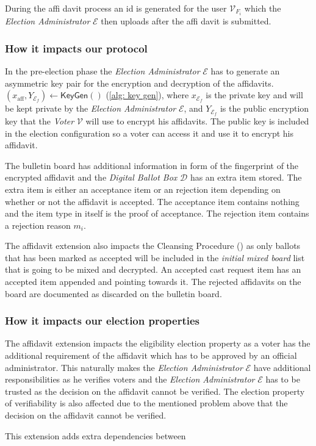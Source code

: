 During the affi davit process an id is generated for the user $\mathcal{V}_{{F}_i}$ which the \textit{Election Administrator} $\mathcal{E}$ then uploads after the affi davit is submitted.


\subsubsection{How it impacts our protocol}
In the pre-election phase the \textit{Election Administrator} $\mathcal{E}$ has to generate an asymmetric key pair for the encryption and decryption of the affidavits. \( (x_\mathrm{aff}, Y_{\mathcal{E}_f}) \leftarrow \mathsf{KeyGen}() \) (\cref{alg: key gen}), where $x_{\mathcal{E}_f}$ is the private key and will be kept private by the \textit{Election Administrator} $\mathcal{E}$, and $Y_{\mathcal{E}_f}$ is the public encryption key that the \textit{Voter} $\mathcal{V}$ will use to encrypt his affidavits. The public key is included in the election configuration so a voter can access it and use it to encrypt his affidavit.

The bulletin board has additional information in form of the fingerprint of the encrypted affidavit and the \textit{Digital Ballot Box} $\mathcal{D}$ has an extra item stored. The extra item is either an acceptance item or an rejection item depending on whether or not the affidavit is accepted. The acceptance item contains nothing and the item type in itself is the proof of acceptance. The rejection item contains a rejection reason $m_i$. 

The affidavit extension also impacts the Cleansing Procedure () as only ballots that has been marked as accepted will be included in the \textit{initial mixed board} list that is going to be mixed and decrypted. An accepted cast request item has an accepted item appended and pointing towards it. The rejected affidavits on the board are documented as discarded on the bulletin board. 


\subsubsection{How it impacts our election properties}
The affidavit extension impacts the eligibility election property as a voter has the additional requirement of the affidavit which has to be approved by an official administrator. This naturally makes the \textit{Election Administrator} $\mathcal{E}$ have additional responsibilities as he verifies voters and the \textit{Election Administrator} $\mathcal{E}$ has to be trusted as the decision on the affidavit cannot be verified.
The election property of verifiability is also affected due to the mentioned problem above that the decision on the affidavit cannot be verified.

This extension adds extra dependencies between
